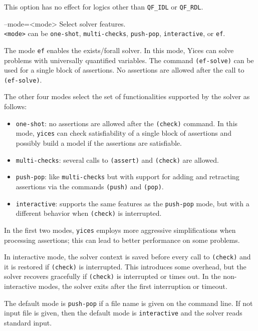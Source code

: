 \documentclass[11pt,twoside,fleqn,openright,titlepage]{cslreport}
\newenvironment{options}{
\begin{list}{}{
\setlength{\labelsep}{1.8ex}
\setlength{\labelwidth}{0pt}
\setlength{\itemindent}{-0.5\leftmargin}
\settowidth{\leftmargin}{\texttt{--}}
\renewcommand{\makelabel}{\optionlabel}}}
{\end{list}}
\newcommand*\optionlabel[1]{\hspace\labelsep\texttt{#1}}
\begin{document}
\begin{options}
  This option has no effect  for logics other than \texttt{QF\_IDL} or
  \texttt{QF\_RDL}.

\item[--mode=<mode>] Select solver features.\\[1mm]
  \texttt{<mode>} can be \texttt{one-shot}, \texttt{multi-checks},
  \texttt{push-pop}, \texttt{interactive}, or \texttt{ef}.

  The mode \texttt{ef} enables the exists/forall solver. In this mode,
  Yices can solve problems  with universally quantified variables. The
  command  \texttt{(ef-solve)}  can be  used  for  a single  block  of
  assertions.    No  assertions   are  allowed   after  the   call  to
  \texttt{(ef-solve)}.

  The other four modes select the set of functionalities supported by
  the solver as follows:
  \begin{itemize}
  \item   \texttt{one-shot}:   no   assertions   are   allowed   after
    the \texttt{(check)} command. In this mode, \texttt{yices} can
    check satisfiability of a single block of assertions and possibly
    build a model if the assertions are satisfiable.
  \item \texttt{multi-checks}: several  calls to \texttt{(assert)} and
    \texttt{(check)} are allowed.
  \item \texttt{push-pop}: like \texttt{multi-checks} but with support
    for   adding   and   retracting   assertions  via   the   commands
    \texttt{(push)} and \texttt{(pop)}.
  \item  \texttt{interactive}:  supports  the  same  features  as  the
    \texttt{push-pop}  mode,  but  with   a  different  behavior  when
    \texttt{(check)} is interrupted.
  \end{itemize}
  In  the  first  two  modes, \texttt{yices}  employs  more  aggressive
  simplifications when processing assertions;  this can lead to better
  performance on some problems.

  In interactive mode,  the solver context is saved  before every call
  to  \texttt{(check)}  and  it  is restored  if  \texttt{(check)}  is
  interrupted. This introduces some  overhead, but the solver recovers
  gracefully if  \texttt{(check)} is interrupted or times  out. In the
  non-interactive modes, the solver exits after the first interruption
  or timeout.

  The default mode is \texttt{push-pop} if a file name is given on the
  command line. If  not input file is given, then  the default mode is
  \texttt{interactive} and the solver reads standard input.


\end{options}
\end{document}
